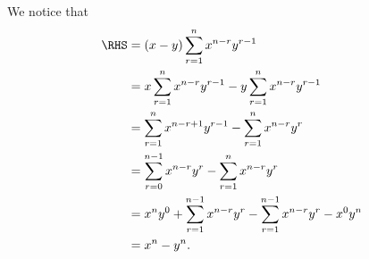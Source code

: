 \Question{\currfilebase}

We notice that
\begin{align*}
    \RHS & = (x - y) \sum_{r = 1}^{n} x^{n - r} y^{r - 1}                                                  \\
         & = x \sum_{r = 1}^{n} x^{n - r} y^{r - 1} - y \sum_{r = 1}^{n} x^{n - r} y^{r - 1}               \\
         & = \sum_{r = 1}^{n} x^{n - r + 1} y^{r - 1} - \sum_{r = 1}^{n} x^{n - r} y^{r}                   \\
         & = \sum_{r = 0}^{n - 1} x^{n - r} y^r - \sum_{r = 1}^{n} x^{n - r} y^{r}                         \\
         & = x^n y^0 + \sum_{r = 1}^{n - 1} x^{n - r} y^r - \sum_{r = 1}^{n - 1} x^{n - r} y^{r} - x^0 y^n \\
         & = x^n - y^n.
\end{align*}

